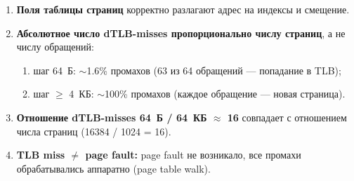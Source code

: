 \begin{enumerate}
\begin{enumerate}
    \item \textbf{Поля таблицы страниц} корректно разлагают адрес на
    индексы и смещение.
    
    \item \textbf{Абсолютное число dTLB-misses пропорционально числу
    страниц}, а не числу обращений:
    \begin{enumerate}
        \item шаг 64~Б: $\sim$1.6\% промахов (63 из 64 обращений —
        попадание в TLB);
        \item шаг $\ge$ 4~КБ: $\sim$100\% промахов (каждое обращение —
        новая страница).
    \end{enumerate}
    
    \item \textbf{Отношение dTLB-misses 64~Б / 64~КБ $\approx$ 16}
    совпадает с отношением числа страниц (16384 / 1024 = 16).
    
    \item \textbf{TLB miss $\ne$ page fault:} page fault не возникало,
    все промахи обрабатывались аппаратно (page table walk).
\end{enumerate}
\end{enumerate}